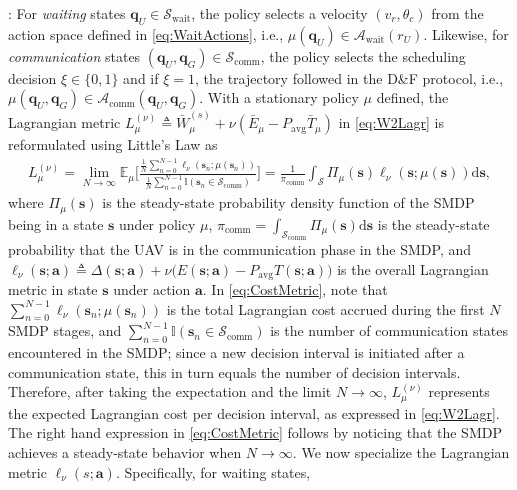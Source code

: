 \documentclass[12pt, draftcls, onecolumn]{IEEEtran}
\theoremstyle{plain}
\theoremstyle{definition}
\theoremstyle{remark}
\begin{document}
: For \emph{waiting} states $\mathbf{q}_{U}{\in}\mathcal{S}_{\mathrm{wait}}$, the policy selects a velocity $(v_{r},\theta_{c})$ from the action space defined in \eqref{eq:WaitActions}, i.e., $\mu(\mathbf{q}_{U}){\in}\mathcal{A}_{\mathrm{wait}}(r_{U})$. Likewise, for \emph{communication} states $(\mathbf{q}_{U},\mathbf{q}_{G}){\in}\mathcal{S}_{\mathrm{comm}}$, the policy selects the scheduling decision $\xi{\in}\{0,1\}$ and if $\xi{=}1$, the trajectory followed in the D\&F protocol, i.e., $\mu(\mathbf{q}_{U},\mathbf{q}_{G}){\in}\mathcal{A}_{\mathrm{comm}}(\mathbf{q}_{U},\mathbf{q}_{G})$. With a stationary policy $\mu$ defined, the Lagrangian metric $L_{\mu}^{(\nu)}{\triangleq}\bar{W}_{\mu}^{(s)}{+}\nu(\bar{E}_{\mu}{-}P_{\mathrm{avg}}\bar{T}_{\mu})$ in \eqref{eq:W2Lagr} is reformulated using Little's Law as
\begin{align}\label{eq:CostMetric}
    L_\mu^{(\nu)}
    = \lim_{N \rightarrow \infty} \mathbb{E}_\mu \Bigg[ \frac{\frac{1}{N}\sum_{n=0}^{N-1}  \ell_\nu(\mathbf{s}_n; \mu(\mathbf{s}_n)) }{\frac{1}{N}\sum_{n = 0}^{N-1} \mathbb I(\mathbf{s}_n \in \mathcal{S}_{\mathrm{comm}})}  \Bigg]
    = \frac{1}{\pi_{\mathrm{comm}}}\int_{\mathcal{S}} \Pi_{\mu}(\mathbf{s})\ell_\nu(\mathbf{s}; \mu(\mathbf{s}))\mathrm{d}\mathbf{s},
\end{align}
where $\Pi_{\mu}(\mathbf{s})$ is the steady-state probability density function of the SMDP being in a state $\mathbf{s}$ under policy $\mu$, $\pi_{\mathrm{comm}}{=}\int_{\mathcal{S}_{\mathrm{comm}}}\!\!\!\!\!\Pi_{\mu}(\mathbf{s})\mathrm{d}\mathbf{s}$ is the steady-state probability that the UAV is in the communication phase in the SMDP, and $\ell_{\nu}(\mathbf{s};\mathbf{a}) \triangleq \Delta(\mathbf{s};\mathbf{a}){+}\nu\big(E(\mathbf{s};\mathbf{a}){-}P_{\mathrm{avg}}T(\mathbf{s};\mathbf{a})\big)$ is the overall Lagrangian metric in state $\mathbf{s}$ under action $\mathbf{a}$. In \eqref{eq:CostMetric}, note that $\sum_{n=0}^{N{-}1}\ell_{\nu}(\mathbf{s}_{n};\mu(\mathbf{s}_{n}))$ is the total Lagrangian cost accrued during the first $N$ SMDP stages, and $\sum_{n{=}0}^{N{-}1}\mathbb{I}(\mathbf{s}_{n}{\in}\mathcal{S}_{\mathrm{comm}})$ is the number of communication states encountered in the SMDP; since a new decision interval is initiated after a communication state, this in turn equals the number of decision intervals. Therefore, after taking the expectation and the limit $N{\to}\infty$, $L_{\mu}^{(\nu)}$ represents the expected Lagrangian cost per decision interval, as expressed in \eqref{eq:W2Lagr}. The right hand expression in \eqref{eq:CostMetric} follows by noticing that the SMDP achieves a steady-state behavior when $N\to\infty$. We now specialize the Lagrangian metric $\ell_{\nu}(s;\mathbf{a})$. Specifically, for waiting states,
\end{document}
